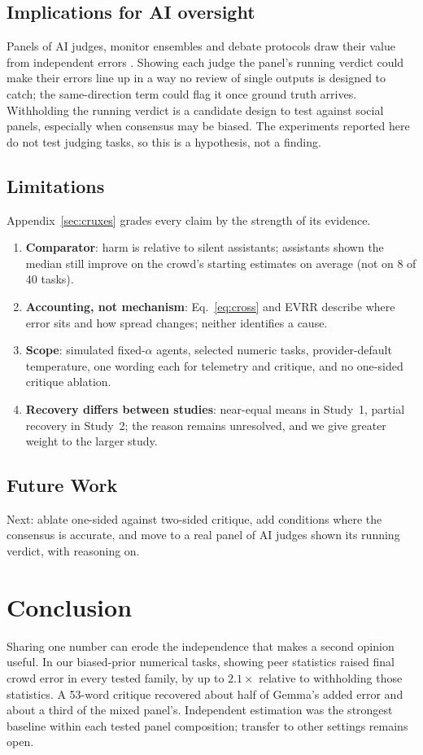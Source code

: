 \documentclass[10pt]{article}
\theoremstyle{manuscript}\newtheorem{proposition}{Proposition}
\begin{document}
\subsection{Implications for AI oversight}\label{sec:oversight}
Panels of AI judges, monitor ensembles and debate protocols draw their value from independent errors \citep{kim2025corr,estornell2024,smit2024}. Showing each judge the panel's running verdict could make their errors line up in a way no review of single outputs is designed to catch; the same-direction term could flag it once ground truth arrives. Withholding the running verdict is a candidate design to test against social panels, especially when consensus may be biased. The experiments reported here do not test judging tasks, so this is a hypothesis, not a finding.

\subsection{Limitations}\label{sec:lim}
Appendix~\ref{sec:cruxes} grades every claim by the strength of its evidence.
\begin{enumerate}
\item \textbf{Comparator}: harm is relative to silent assistants; assistants shown the median still improve on the crowd's starting estimates on average (not on 8 of 40 tasks).
\item \textbf{Accounting, not mechanism}: Eq.~\ref{eq:cross} and EVRR describe where error sits and how spread changes; neither identifies a cause.
\item \textbf{Scope}: simulated fixed-$\alpha$ agents, selected numeric tasks, provider-default temperature, one wording each for telemetry and critique, and no one-sided critique ablation.
\item \textbf{Recovery differs between studies}: near-equal means in Study~1, partial recovery in Study~2; the reason remains unresolved, and we give greater weight to the larger study.
\end{enumerate}

\subsection{Future Work}\label{sec:future}
Next: ablate one-sided against two-sided critique, add conditions where the consensus is accurate, and move to a real panel of AI judges shown its running verdict, with reasoning on.

\section{Conclusion}
Sharing one number can erode the independence that makes a second opinion useful. In our biased-prior numerical tasks, showing peer statistics raised final crowd error in every tested family, by up to $2.1\times$ relative to withholding those statistics. A 53-word critique recovered about half of Gemma's added error and about a third of the mixed panel's. Independent estimation was the strongest baseline within each tested panel composition; transfer to other settings remains open.
\end{document}
